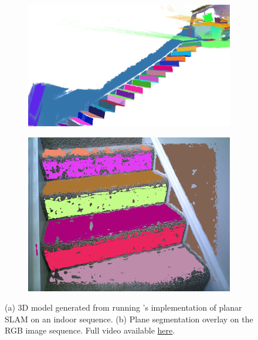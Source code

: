 \documentclass[12pt]{article}
\begin{document}
\begin{itemize}
\begin{figure}[H]
\centering
\begin{subfigure}{.5\textwidth}
  \centering
  \includegraphics[width=\linewidth]{stairs1}
\end{subfigure}%
\begin{subfigure}{.5\textwidth}
  \centering
  \includegraphics[width=\linewidth]{seg_plane_stairs}
\end{subfigure}
\caption{(a) 3D model generated from running \cite{kaess2015simultaneous}'s implementation of planar SLAM on an indoor sequence. (b) Plane segmentation overlay on the RGB image sequence. Full video available \href{https://www.youtube.com/watch?v=2buLgigmanc&}{here}.}
\label{fig:stairs} 
\end{figure}







\end{itemize}
\end{document}
